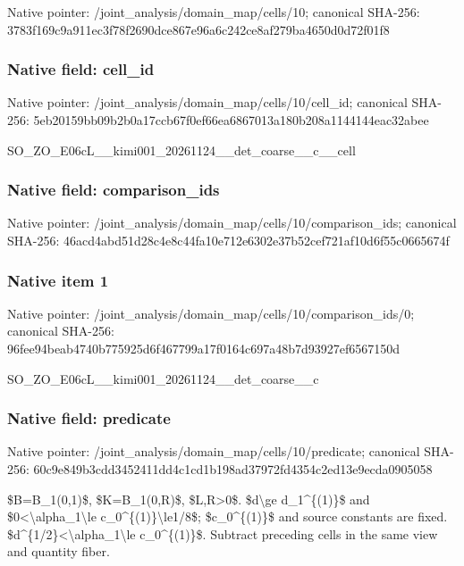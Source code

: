 \documentclass[10pt,a4paper]{article}
\begin{document}
Native pointer: /joint\_analysis/domain\_map/cells/10; canonical SHA-256: 3783f169c9a911ec3f78f269\allowbreak{}0dce867e96a6c242ce8af279\allowbreak{}ba4650d0d72f01f8



\subsubsection{Native field: cell\_id}


Native pointer: /joint\_analysis/domain\_m\allowbreak{}ap/cells/10/cell\_id; canonical SHA-256: 5eb20159bb09b2b0a17ccb67\allowbreak{}f0ef66ea6867013a180b208a\allowbreak{}1144144eac32abee


SO\_ZO\_E06cL\_\_kimi001\_202\allowbreak{}61124\_\_det\_coarse\_\_c\_\_ce\allowbreak{}ll


\subsubsection{Native field: comparison\_ids}


Native pointer: /joint\_analysis/domain\_m\allowbreak{}ap/cells/10/comparison\_i\allowbreak{}ds; canonical SHA-256: 46acd4abd51d28c4e8c44fa1\allowbreak{}0e712e6302e37b52cef721af\allowbreak{}10d6f55c0665674f



\subsubsection{Native item 1}


Native pointer: /joint\_analysis/domain\_m\allowbreak{}ap/cells/10/comparison\_i\allowbreak{}ds/0; canonical SHA-256: 96fee94beab4740b775925d6\allowbreak{}f467799a17f0164c697a48b7\allowbreak{}d93927ef6567150d


SO\_ZO\_E06cL\_\_kimi001\_202\allowbreak{}61124\_\_det\_coarse\_\_c


\subsubsection{Native field: predicate}


Native pointer: /joint\_analysis/domain\_m\allowbreak{}ap/cells/10/predicate; canonical SHA-256: 60c9e849b3cdd3452411dd4c\allowbreak{}1cd1b198ad37972fd4354c2e\allowbreak{}d13e9ecda0905058


\$B=B\_1(0,1)\$, \$K=B\_1(0,R)\$, \$L,R>0\$. \$d\textbackslash{}ge d\_1\textasciicircum{}\{(1)\}\$ and \$0<\textbackslash{}alpha\_1\textbackslash{}le c\_0\textasciicircum{}\{(1)\}\textbackslash{}le1/8\$; \$c\_0\textasciicircum{}\{(1)\}\$ and source constants are fixed. \$d\textasciicircum{}\{1/2\}<\textbackslash{}alpha\_1\textbackslash{}le c\_0\textasciicircum{}\{(1)\}\$. Subtract preceding cells in the same view and quantity fiber.
\end{document}
